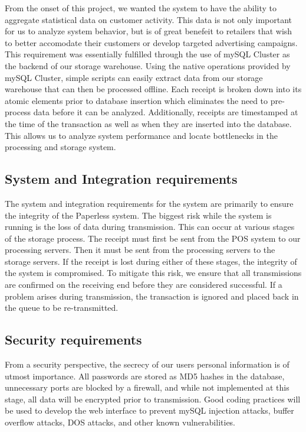 From the onset of this project, we wanted the system to have the ability to aggregate statistical data on customer activity.  This data is not only important for us to analyze system behavior, but is of great benefeit to retailers that wish to better accomodate their customers or develop targeted advertising campaigns.  This requirement was essentially fulfilled through the use of mySQL Cluster as the backend of our storage warehouse.  Using the native operations provided by mySQL Cluster, simple scripts can easily extract data from our storage warehouse that can then be processed offline.  Each receipt is broken down into its atomic elements prior to database insertion which eliminates the need to pre-process data before it can be analyzed.  Additionally, receipts are timestamped at the time of the transaction as well as when they are inserted into the database.  This allows us to analyze system performance and locate bottlenecks in the processing and storage system.

\subsection{System and Integration requirements}
\label{sec:requirements.system}

The system and integration requirements for the system are primarily to ensure the integrity of the Paperless system.  The biggest risk while the system is running is the loss of data during transmission.  This can occur at various stages of the storage process.  The receipt must first be sent from the POS system to our processing servers.  Then it must be sent from the processing servers to the storage servers.  If the receipt is lost during either of these stages, the integrity of the system is compromised.  To mitigate this risk, we ensure that all transmissions are confirmed on the receiving end before they are considered successful.  If a problem arises during transmission, the transaction is ignored and placed back in the queue to be re-transmitted.

\subsection{Security requirements}
\label{sec:requirements.security}

From a security perspective, the secrecy of our users personal information is of utmost importance.  All passwords are stored as MD5 hashes in the database, unnecessary ports are blocked by a firewall, and while not implemented at this stage, all data will be encrypted prior to transmission.  Good coding practices will be used to develop the web interface to prevent mySQL injection attacks, buffer overflow attacks, DOS attacks, and other known vulnerabilities.

